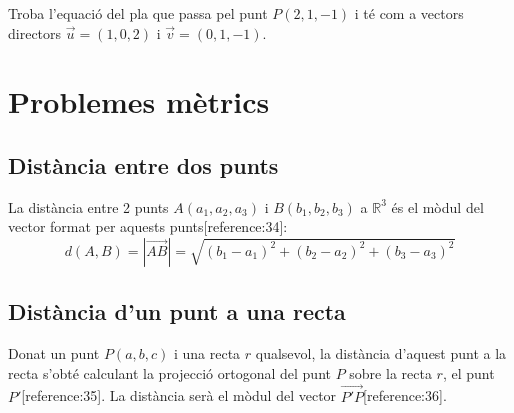 \documentclass[12pt]{article}
\begin{document}
\begin{exercici}
Troba l'equació del pla que passa pel punt $P(2,1,-1)$ i té com a vectors directors $\vec{u}=(1,0,2)$ i $\vec{v}=(0,1,-1)$.
\end{exercici}

\section{Problemes mètrics}

\subsection{Distància entre dos punts}

\begin{concept}
La distància entre 2 punts $A(a_1,a_2,a_3)$ i $B(b_1,b_2,b_3)$ a $\mathbb{R}^3$ és el mòdul del vector format per aquests punts[reference:34]:
\[
\boxed{d(A,B) = |\overrightarrow{AB}| = \sqrt{(b_1-a_1)^2 + (b_2-a_2)^2 + (b_3-a_3)^2}}
\]
\end{concept}

\subsection{Distància d'un punt a una recta}

\begin{concept}
Donat un punt $P(a,b,c)$ i una recta $r$ qualsevol, la distància d'aquest punt a la recta s'obté calculant la projecció ortogonal del punt $P$ sobre la recta $r$, el punt $P'$[reference:35]. La distància serà el mòdul del vector $\overrightarrow{P'P}$[reference:36].
\end{concept}
\end{document}
